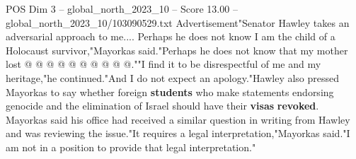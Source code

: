 \begin{textsample}{POS Dim 3 – global\_north\_2023\_10 – Score 13.00 – global\_north\_2023\_10/103090529.txt}
Advertisement"Senator Hawley takes an adversarial approach to me....
Perhaps he does not know I am the child of a Holocaust survivor,"Mayorkas said."Perhaps he does not know that my mother lost @ @ @ @ @ @ @ @ @ @.""I find it to be disrespectful of me and my heritage,"he continued."And I do not expect an apology."Hawley also pressed Mayorkas to say whether foreign \textbf{students} who make statements endorsing genocide and the elimination of Israel should have their \textbf{visas} \textbf{revoked}.
Mayorkas said his office had received a similar question in writing from Hawley and was reviewing the issue."It requires a legal interpretation,"Mayorkas said."I am not in a position to provide that legal interpretation."

\end{textsample}
